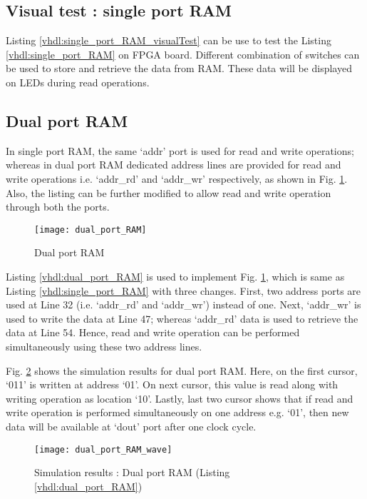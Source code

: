 

\subsection{Visual test : single port RAM}
Listing \ref{vhdl:single_port_RAM_visualTest} can be use to test the Listing \ref{vhdl:single_port_RAM} on FPGA board. Different combination of switches can be used to store and retrieve the data from RAM. These data will be displayed on LEDs during read operations. 
 


\subsection{Dual port RAM}
In single port RAM, the same `addr' port is used for read and write operations; whereas in dual port RAM dedicated address lines are provided for read and write operations i.e. `addr\_rd' and `addr\_wr' respectively, as shown in Fig. \ref{fig:dual_port_RAM}. Also, the listing can be further modified to allow read and write operation through both the ports. 

\begin{figure}[!h]
	\centering
	\texttt{[image: dual\_port\_RAM]}
	\caption{Dual port RAM}
	\label{fig:dual_port_RAM}
\end{figure}

Listing \ref{vhdl:dual_port_RAM} is used to implement Fig. \ref{fig:dual_port_RAM}, which is same as Listing \ref{vhdl:single_port_RAM} with three changes. First, two address ports are used at Line 32 (i.e. `addr\_rd' and `addr\_wr') instead of one. Next, `addr\_wr' is used to write the data at Line 47; whereas `addr\_rd' data is used to retrieve the data at Line 54. Hence, read and write operation can be performed simultaneously using these two address lines.

Fig. \ref{fig:dual_port_RAM_wave} shows the simulation results for dual port RAM. Here, on the first cursor, `011' is written at address `01'. On next cursor, this value is read along with writing operation as location `10'. Lastly, last two cursor shows that if read and write operation is performed simultaneously on one address e.g. `01', then new data will be available at `dout' port after one clock cycle. 
\begin{figure}[!h]
	\centering
	\texttt{[image: dual\_port\_RAM\_wave]}
	\caption{Simulation results : Dual port RAM (Listing \ref{vhdl:dual_port_RAM})}
	\label{fig:dual_port_RAM_wave}
\end{figure}

